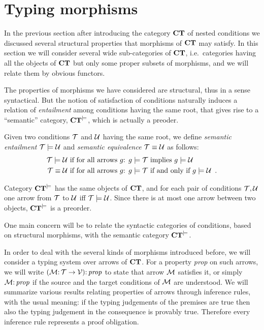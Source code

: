 \section{Typing morphisms}
\label{sec:typing morphisms}


In the previous section after introducing the category $\mathbf{CT}$ of nested conditions we discussed several structural properties that morphisms of $\mathbf{CT}$ may satisfy. In this section we will consider several wide sub-categories of $\mathbf{CT}$, i.e.~categories having all the objects of $\mathbf{CT}$ but only some proper subsets of morphisms, and we will relate them by obvious functors. 

The properties of morphisms we have considered are structural, thus in a sense syntactical. But the notion of satisfaction of conditions naturally induces a relation of \emph{entailment} among conditions having the same root, that gives rise to a ``semantic'' category, $\mathbf{CT}^{\models}$, which is actually a preoder. 

\begin{definition}
Given two conditions ${\mathcal{T}}$ and ${\mathcal{U}}$ having the same root,  we define \emph{semantic entailment} ${\mathcal{T}} \models {\mathcal{U}}$ and \emph{semantic equivalence} ${\mathcal{T}} \equiv {\mathcal{U}}$ as follows:
\begin{align*}
{\mathcal{T}} \models {\mathcal{U}} & \text{ if for all arrows $g$: } g\models {\mathcal{T}} \text{ implies } g\models {\mathcal{U}} \\
{\mathcal{T}} \equiv {\mathcal{U}} & \text{ if for all arrows $g$: } g\models {\mathcal{T}} \text{ if and only if } g\models {\mathcal{U}} \enspace. 
\end{align*}

Category $\mathbf{CT}^{\models}$ has the same objects of $\mathbf{CT}$, and for each pair of conditions ${\mathcal{T}},{\mathcal{U}}$ one arrow from ${\mathcal{T}}$ to ${\mathcal{U}}$ iff ${\mathcal{T}} \models {\mathcal{U}}$. Since there is at most one arrow between two objects, $\mathbf{CT}^{\models}$ is a preorder.
\end{definition}

One main concern will be to relate the syntactic categories of conditions, based on structural morphisms, with the semantic category $\mathbf{CT}^{\models}$. 

In order to deal with the several kinds of morphisms introduced before, we will consider a typing system over arrows of $\mathbf{CT}$. For a property \emph{prop} on such arrows, we will write $({\mathcal{M}} {:}\, {\mathcal{T}} \rightarrow {\mathcal{V}}) {:}\, \mathit{prop}$ to state that arrow ${\mathcal{M}}$ satisfies it, or simply ${\mathcal{M}} {:}\, \mathit{prop}$ if the source and the target conditions of ${\mathcal{M}}$ are understood. We will summarize various results relating properties of arrows through inference rules, with the usual meaning: if the typing judgements of the premises are true then also the typing judgement in the consequence is provably true. Therefore every inference rule represents a proof obligation.


